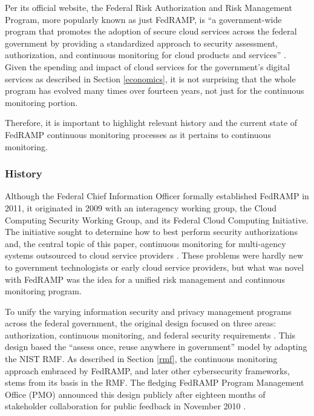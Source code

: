 \documentclass{jdf}
\begin{document}
Per its official website, the Federal Risk Authorization and Risk Management Program, more popularly known as just FedRAMP, is ``a government-wide program that promotes the adoption of secure cloud services across the federal government by providing a standardized approach to security assessment, authorization, and continuous monitoring for cloud products and services'' \citeyear{fedramp_definition25}. Given the spending and impact of cloud services for the government's digital services as described in Section \ref{economics}, it is not surprising that the whole program has evolved many times over fourteen years, not just for the continuous monitoring portion.

Therefore, it is important to highlight relevant history and the current state of FedRAMP continuous monitoring processes as it pertains to continuous monitoring.

\subsubsection{History} \label{fedramp_history}

Although the Federal Chief Information Officer formally established FedRAMP in 2011, it originated in 2009 with an interagency working group, the Cloud Computing Security Working Group, and its Federal Cloud Computing Initiative. The initiative sought to determine how to best perform security authorizations and, the central topic of this paper, continuous monitoring for multi-agency systems outsourced to cloud service providers \cite[p.~239]{metheny17}. These problems were hardly new to government technologists or early cloud service providers, but what was novel with FedRAMP was the idea for a unified risk management and continuous monitoring program.

To unify the varying information security and privacy management programs across the federal government, the original design focused on three areas: authorization, continuous monitoring, and federal security requirements \cite[p.~240]{metheny17}. This design based the ``assess once, reuse anywhere in government'' model by adapting the NIST RMF. As described in Section \ref{rmf}, the continuous monitoring approach embraced by FedRAMP, and later other cybersecurity frameworks, stems from its basis in the RMF. The fledging FedRAMP Program Management Office (PMO) announced this design publicly after eighteen months of stakeholder collaboration for public feedback in November 2010 \cite[p.~240]{metheny17}.
\end{document}
